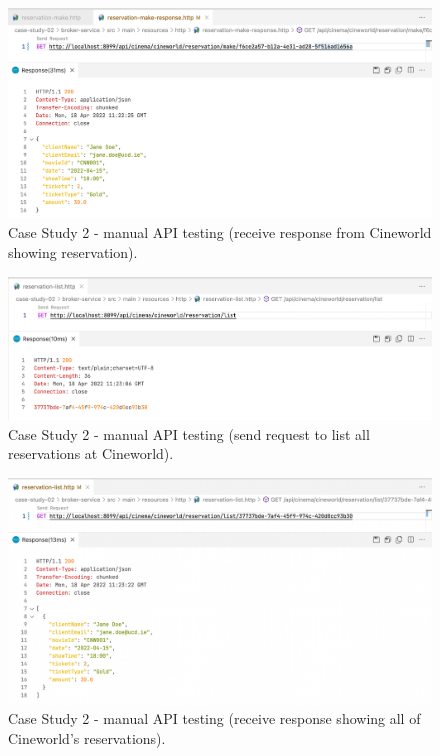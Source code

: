 \begin{figure}[H]
  \centering
  \includegraphics[width=1.0\linewidth]{./assets/images/case-study-02/cs02-manual-4.png}
  \caption{Case Study 2 - manual API testing (receive response from Cineworld showing reservation).}
  \label{fig:cs02-manual-4}
\end{figure}

\begin{figure}[H]
  \centering
  \includegraphics[width=1.0\linewidth]{./assets/images/case-study-02/cs02-manual-5.png}
  \caption{Case Study 2 - manual API testing (send request to list all reservations at Cineworld).}
  \label{fig:cs02-manual-5}
\end{figure}

\begin{figure}[H]
  \centering
  \includegraphics[width=1.0\linewidth]{./assets/images/case-study-02/cs02-manual-6.png}
  \caption{Case Study 2 - manual API testing (receive response showing all of Cineworld's reservations).}
  \label{fig:cs02-manual-6}
\end{figure}








